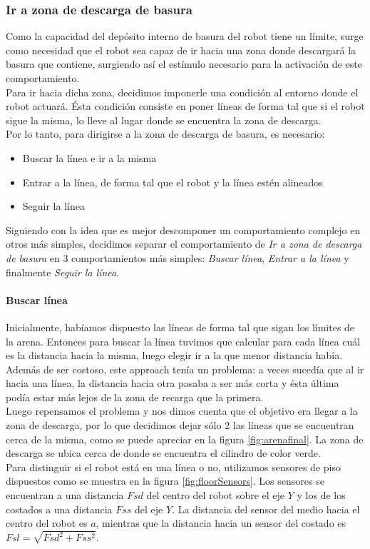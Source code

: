\subsubsection{Ir a zona de descarga de basura}
\label{go_to_unload_zone}
Como la capacidad del dep\'osito interno de basura del robot tiene un l\'imite, 
surge como necesidad que el robot sea capaz de ir hacia una zona donde descargar\'a
la basura que contiene, surgiendo as\'i el est\'imulo necesario para la activaci\'on
de este comportamiento.
\\
Para ir hacia dicha zona, decidimos imponerle una condici\'on al
entorno donde el robot actuar\'a. \'Esta condici\'on consiste en poner l\'ineas
de forma tal que si el robot sigue la misma, lo lleve al lugar donde se
encuentra la zona de descarga.
\\
Por lo tanto, para dirigirse a la zona de descarga de basura, es necesario:
\begin{itemize}
	\item Buscar la l\'inea e ir a la misma
	\item Entrar a la l\'inea, de forma tal que el robot y la l\'inea est\'en alineados
	\item Seguir la l\'inea
\end{itemize}
Siguiendo con la idea que es mejor descomponer un comportamiento complejo en otros
m\'as simples, decidimos separar el comportamiento de \emph{Ir a zona de descarga de basura}
en 3 comportamientos m\'as simples: \emph{Buscar l\'inea}, \emph{Entrar a la l\'inea} y
finalmente \emph{Seguir la l\'inea}.

\paragraph{Buscar l\'inea}
\label{find_line}
Inicialmente, hab\'iamos dispuesto las l\'ineas de forma tal que sigan los l\'imites de la
arena. Entonces para buscar la l\'inea tuvimos que calcular para cada l\'inea
cu\'al es la distancia hacia la misma, luego elegir ir a la que menor distancia hab\'ia.
Adem\'as de ser costoso, este approach ten\'ia un problema: a veces suced\'ia que al ir hacia una
l\'inea, la distancia hacia otra pasaba a ser m\'as corta y \'esta \'ultima pod\'ia estar m\'as
lejos de la zona de recarga que la primera.
\\
Luego repensamos el problema y nos dimos cuenta que el objetivo era llegar a la zona de descarga,
por lo que decidimos dejar s\'olo 2 las l\'ineas que se encuentran cerca de la misma, como se
puede apreciar en la figura \ref{fig:arenafinal}. La zona de descarga se ubica cerca de donde
se encuentra el cilindro de color verde.
\\
Para distinguir si el robot est\'a en una l\'inea o no, utilizamos sensores de piso dispuestos
como se muestra en la figura \ref{fig:floorSensors}. Los sensores se encuentran a una distancia
$Fsd$ del centro del robot sobre el eje $Y$ y los de los costados a una distancia $Fss$ del eje $Y$.
La distancia del sensor del medio hacia el centro del robot es $a$, mientras que la distancia
hacia un sensor del costado es $Fsl = \sqrt{Fsd^2 + Fss^2}$.

